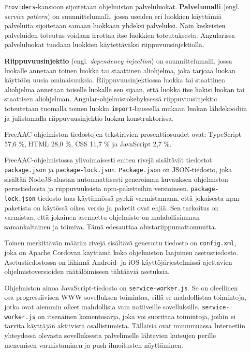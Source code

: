 \documentclass[utf8]{gradu3}
\begin{document}
\texttt{Providers}-kansioon sijoitetaan ohjelmiston palveluluokat. \textbf{Palvelumalli} (engl. \textit{service pattern}) on suunnittelumalli, jossa useiden eri luokkien käyttämiä palveluita sijoitetaan samaan luokkaan yhdeksi palveluksi. Näin keskeisten palveluiden toteutus voidaan irrottaa itse luokkien toteutuksesta. Angularissa palveluluokat tuodaan luokkien käytettäväksi riippuvuusinjektiolla.

\textbf{Riippuvuusinjektio} (engl. \textit{dependency injection}) on suunnittelumalli, jossa luokalle annetaan toinen luokka tai staattinen aliohjelma, joka tarjoaa luokan käyttöön uusia ominaisuuksia. Riippuvuusinjektiossa luokka tai staattinen aliohjelma annetaan toiselle luokalle sen sijaan, että luokka itse hakisi luokan tai staattisen aliohjelman. Angular-ohjelmistokehyksessä riippuvuusinjektio toteutetaan tuomalla toinen luokka \texttt{import}-lauseella mukaan luokan lähdekoodiin ja julistamalla riippuvuusinjektio luokan konstruktorissa.

FreeAAC-ohjelmiston tiedostojen tekstirivien prosenttiosuudet ovat: TypeScript 57,6 \%, HTML 28,0 \%, CSS 11,7 \% ja JavaScript 2,7 \%.

FreeAAC-ohjelmistossa ylivoimaisesti eniten rivejä sisältävät tiedostot \texttt{package.json} ja \texttt{package-lock.json}. \texttt{Package.json} on JSON-tiedosto, joka sisältää NodeJS-alustan automaattisesti generoiman kuvauksen ohjelmiston perustiedoista ja riippuvuuksista npm-paketteihin versioineen. \texttt{package-lock.json}-tiedosto taas käytännössä pyrkii varmistamaan, että jokaisesta npm-paketista on käytössä oikea versio ja paketit ovat ehjiä. Sen tarkoitus on varmistaa, että jokainen asennettu ohjelmisto on mahdollisimman samankaltainen ja toimiva. Tämä edesauttaa alustariippumattomuutta.

Toinen merkittävän määrän rivejä sisältävä generoitu tiedosto on \texttt{config.xml}, joka on Apache Cordovan käyttämä koko ohjelmiston laajuinen asetustiedosto. Asetustiedostossa on lähinnä Android- ja iOS-käyttöjärjestelmissä ajettavien ohjelmistoversioiden räätälöimiseen tähtääviä asetuksia.

Ohjelmiston ainoa JavaScript-tiedosto on \texttt{service-worker.js}. Se on oleellinen osa progressiivisen WWW-sovelluksen toimintaa, sillä se mahdollistaa toimintoja, jotka ovat aiemmin olleet mahdollisia vain natiiveille sovelluksille. \texttt{service-worker.js} on itsenäinen komentosarja, joka voi suorittaa toimintoja, joihin ei tarvita käyttäjän aktiivista osallistumista. Tällaisia ovat muunmuassa Internetiin yhteydessä olevasta sovelluksesta palvelimelle lähtevien kutsujen perille menemisen varmistaminen ja push-ilmoitusten näyttäminen.
\end{document}
